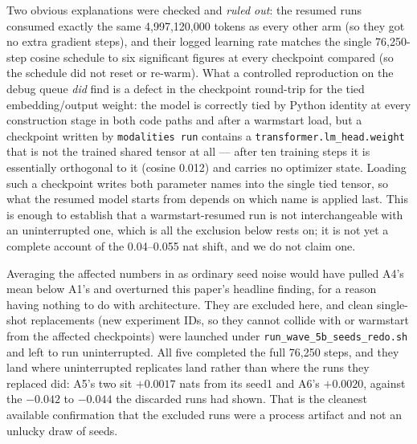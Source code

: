 \documentclass[11pt,a4paper]{article}
\begin{document}
Two obvious explanations were checked and \emph{ruled out}: the resumed runs consumed exactly the
same 4{,}997{,}120{,}000 tokens as every other arm (so they got no extra gradient steps), and their
logged learning rate matches the single 76{,}250-step cosine schedule to six significant figures at
every checkpoint compared (so the schedule did not reset or re-warm). What a controlled reproduction
on the debug queue \emph{did} find is a defect in the checkpoint round-trip for the tied
embedding/output weight: the model is correctly tied by Python identity at every construction stage
in both code paths and after a warmstart load, but a checkpoint written by \texttt{modalities run}
contains a \texttt{transformer.lm\_head.weight} that is not the trained shared tensor at all ---
after ten training steps it is essentially orthogonal to it (cosine 0.012) and carries no optimizer
state. Loading such a checkpoint writes both parameter names into the single tied tensor, so what
the resumed model starts from depends on which name is applied last. This is enough to establish
that a warmstart-resumed run is not interchangeable with an uninterrupted one, which is all the
exclusion below rests on; it is not yet a complete account of the 0.04--0.055 nat shift, and we do
not claim one.

Averaging the affected numbers in as ordinary seed noise would have pulled A4's mean below A1's and
overturned this paper's headline finding, for a reason having nothing to do with architecture. They
are excluded here, and clean single-shot replacements (new experiment IDs, so they cannot collide
with or warmstart from the affected checkpoints) were launched under
\texttt{run\_wave\_5b\_seeds\_redo.sh} and left to run uninterrupted. All five completed the full
76{,}250 steps, and they land where uninterrupted replicates land rather than where the runs they
replaced did: A5's two sit $+0.0017$ nats from its seed1 and A6's $+0.0020$, against the $-0.042$
to $-0.044$ the discarded runs had shown. That is the cleanest available confirmation that the
excluded runs were a process artifact and not an unlucky draw of seeds.
\end{document}
